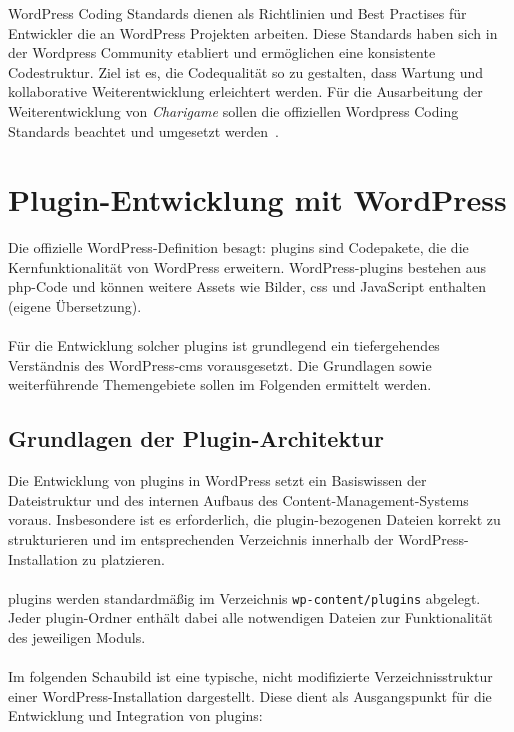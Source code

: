 WordPress Coding Standards dienen als Richtlinien und Best Practises für Entwickler die an WordPress Projekten arbeiten.
Diese Standards haben sich in der Wordpress Community etabliert und ermöglichen eine konsistente Codestruktur.
Ziel ist es, die Codequalität so zu gestalten, dass Wartung und kollaborative Weiterentwicklung erleichtert werden.
Für die Ausarbeitung der Weiterentwicklung von \textit{Charigame} sollen die offiziellen Wordpress Coding Standards beachtet und umgesetzt werden~\cite{wordpress2024codingstandards}.


\section{Plugin-Entwicklung mit WordPress}

Die offizielle WordPress-Definition besagt: \glqq \gls{plugin}s sind Codepakete, die die Kernfunktionalität von WordPress erweitern.
WordPress-\gls{plugin}s bestehen aus \gls{php}-Code und können weitere Assets wie Bilder,
\gls{css} und JavaScript enthalten\grqq{} \cite{wordpress2024plugin} (eigene Übersetzung).
\\ \\
Für die Entwicklung solcher \gls{plugin}s ist grundlegend ein tiefergehendes Verständnis des WordPress-\gls{cms} vorausgesetzt.
Die Grundlagen sowie weiterführende Themengebiete sollen im Folgenden ermittelt werden.



\subsection{Grundlagen der Plugin-Architektur}

Die Entwicklung von \gls{plugin}s in WordPress setzt ein Basiswissen der Dateistruktur und des internen Aufbaus des Content-Management-Systems voraus.
Insbesondere ist es erforderlich, die \gls{plugin}-bezogenen Dateien korrekt zu strukturieren und im entsprechenden Verzeichnis innerhalb der WordPress-Installation zu platzieren.\\\\
\gls{plugin}s werden standardmäßig im Verzeichnis \texttt{wp-content/plugins} abgelegt.
Jeder \gls{plugin}-Ordner enthält dabei alle notwendigen Dateien zur Funktionalität des jeweiligen Moduls.\\\\
Im folgenden Schaubild ist eine typische, nicht modifizierte Verzeichnisstruktur einer WordPress-Installation dargestellt.
Diese dient als Ausgangspunkt für die Entwicklung und Integration von \gls{plugin}s:

